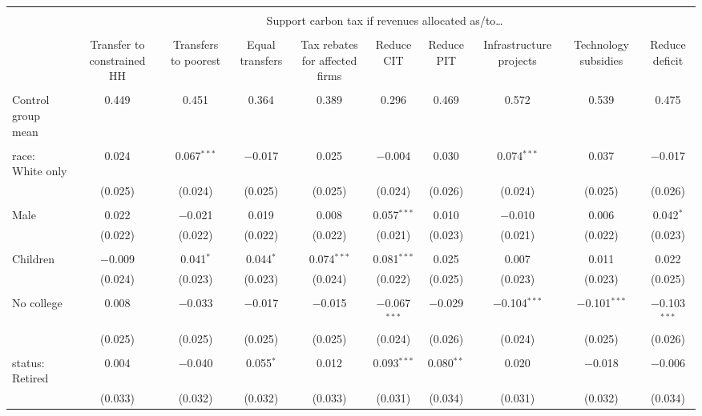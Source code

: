 
\begin{tabular}{@{\extracolsep{5pt}}lccccccccc} 
\\[-1.8ex]\hline 
\hline \\[-1.8ex] 
 & \multicolumn{9}{c}{Support carbon tax if revenues allocated as/to…} \\ 
\cline{2-10} 
\\[-1.8ex] & Transfer to constrained HH & Transfers to poorest & Equal transfers & Tax rebates for affected firms & Reduce CIT & Reduce PIT & Infrastructure projects & Technology subsidies & Reduce deficit \\ 
\hline \\[-1.8ex] 
 Control group mean & 0.449 & 0.451 & 0.364 & 0.389 & 0.296 & 0.469 & 0.572 & 0.539 & 0.475  \\ \hline \\[-1.8ex] race: White only & 0.024 & 0.067$^{***}$ & $-$0.017 & 0.025 & $-$0.004 & 0.030 & 0.074$^{***}$ & 0.037 & $-$0.017 \\ 
  & (0.025) & (0.024) & (0.025) & (0.025) & (0.024) & (0.026) & (0.024) & (0.025) & (0.026) \\ 
  & & & & & & & & & \\ 
 Male & 0.022 & $-$0.021 & 0.019 & 0.008 & 0.057$^{***}$ & 0.010 & $-$0.010 & 0.006 & 0.042$^{*}$ \\ 
  & (0.022) & (0.022) & (0.022) & (0.022) & (0.021) & (0.023) & (0.021) & (0.022) & (0.023) \\ 
  & & & & & & & & & \\ 
 Children & $-$0.009 & 0.041$^{*}$ & 0.044$^{*}$ & 0.074$^{***}$ & 0.081$^{***}$ & 0.025 & 0.007 & 0.011 & 0.022 \\ 
  & (0.024) & (0.023) & (0.023) & (0.024) & (0.022) & (0.025) & (0.023) & (0.023) & (0.025) \\ 
  & & & & & & & & & \\ 
 No college & 0.008 & $-$0.033 & $-$0.017 & $-$0.015 & $-$0.067$^{***}$ & $-$0.029 & $-$0.104$^{***}$ & $-$0.101$^{***}$ & $-$0.103$^{***}$ \\ 
  & (0.025) & (0.025) & (0.025) & (0.025) & (0.024) & (0.026) & (0.024) & (0.025) & (0.026) \\ 
  & & & & & & & & & \\ 
 status: Retired & 0.004 & $-$0.040 & 0.055$^{*}$ & 0.012 & 0.093$^{***}$ & 0.080$^{**}$ & 0.020 & $-$0.018 & $-$0.006 \\ 
  & (0.033) & (0.032) & (0.032) & (0.033) & (0.031) & (0.034) & (0.031) & (0.032) & (0.034) \\ 

\end{tabular}
